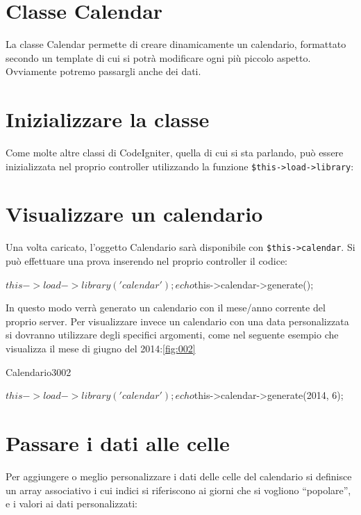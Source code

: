 \section{Classe Calendar}
\label{class:calendario}

La classe Calendar permette di creare dinamicamente un calendario, formattato secondo un template di cui si potrà modificare ogni più piccolo aspetto. Ovviamente potremo passargli anche dei dati.

\section*{Inizializzare la classe}
Come molte altre classi di CodeIgniter, quella di cui si sta parlando, può essere inizializzata nel proprio controller utilizzando la funzione \verb|$this->load->library|:


\section*{Visualizzare un calendario}
Una volta caricato, l'oggetto Calendario sarà disponibile con \verb|$this->calendar|. Si può effettuare una prova inserendo nel proprio controller il codice:

\begin{code}
$this->load->library('calendar');

echo $this->calendar->generate();
\end{code}

In questo modo verrà generato un calendario con il mese/anno corrente del proprio server. Per visualizzare invece un calendario con una data personalizzata si dovranno utilizzare degli specifici argomenti, come nel seguente esempio che visualizza il mese di giugno del 2014:\vref{fig:002}

\begin{img}{Calendario}{3}{002}
\end{img}

\begin{code}
$this->load->library('calendar');

echo $this->calendar->generate(2014, 6);
\end{code}

\section*{Passare i dati alle celle}
Per aggiungere o meglio personalizzare i dati delle celle del calendario si definisce un array associativo i cui indici si riferiscono ai giorni che si vogliono ``popolare'', e i valori ai dati personalizzati:

